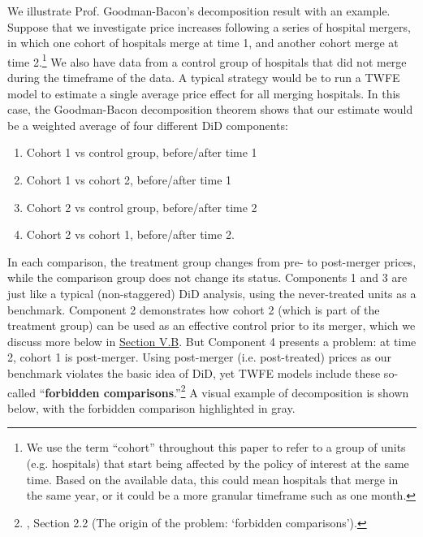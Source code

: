 \documentclass[12pt]{article}
\begin{document}
We illustrate Prof. Goodman-Bacon's decomposition result with an example. Suppose that we investigate price increases following a series of hospital mergers, in which one cohort of hospitals merge at time 1, and another cohort merge at time 2.\footnote{We use the term ``cohort'' throughout this paper to refer to a group of units (e.g. hospitals) that start being affected by the policy of interest at the same time. Based on the available data, this could mean hospitals that merge in the same year, or it could be a more granular timeframe such as one month.} We also have data from a control group of hospitals that did not merge during the timeframe of the data. A typical strategy would be to run a TWFE model to estimate a single average price effect for all merging hospitals. In this case, the Goodman-Bacon decomposition theorem shows that our estimate would be a weighted average of four different DiD components:
\begin{enumerate}
    \item Cohort 1 vs control group, before/after time 1
    \item Cohort 1 vs cohort 2, before/after time 1
    \item Cohort 2 vs control group, before/after time 2
    \item Cohort 2 vs cohort 1, before/after time 2.
\end{enumerate}

In each comparison, the treatment group changes from pre- to post-merger prices, while the comparison group does not change its status. Components 1 and 3 are just like a typical (non-staggered) DiD analysis, using the never-treated units as a benchmark. Component 2 demonstrates how cohort 2 (which is part of the treatment group) can be used as an effective control prior to its merger, which we discuss more below in \hyperref[sec:notyettreated]{Section V.B}. But Component 4 presents a problem: at time 2, cohort 1 is post-merger. Using post-merger (i.e. post-treated) prices as our benchmark violates the basic idea of DiD, yet TWFE models include these so-called “\textbf{forbidden comparisons}.”\footnote{\citet{de2023two}, Section 2.2 (The origin of the problem: ‘forbidden comparisons’).} A visual example of decomposition is shown below, with the forbidden comparison highlighted in gray.
\end{document}
